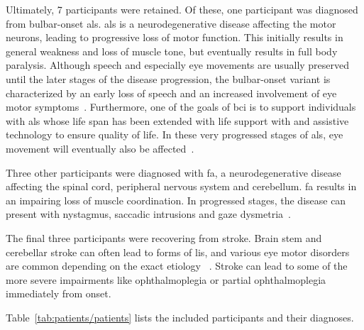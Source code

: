Ultimately, 7 participants were retained.
Of these, one participant was diagnosed from bulbar-onset \ac{als}.
\ac{als} is a neurodegenerative disease affecting the motor neurons, leading to
progressive loss of motor function.
This initially results in general weakness and loss of muscle tone, but
eventually results in full body paralysis.
Although speech and especially eye movements are usually preserved until the
later stages of the disease progression, the bulbar-onset variant is
characterized by an early loss of speech and an increased involvement of eye
motor symptoms~\cite{Guo2022}.
Furthermore, one of the goals of \ac{bci} is to support individuals with \ac{als}
whose life span has been extended with life support with and assistive technology to
ensure quality of life.
In these very progressed stages of \ac{als}, eye movement will eventually also
be affected~\cite{Hayashi1991}.

Three other participants were diagnosed with \ac{fa}, a neurodegenerative
disease affecting the
spinal cord, peripheral nervous system and cerebellum.
\ac{fa} results in an impairing loss of muscle coordination.
In progressed stages, the disease can present with nystagmus, saccadic
intrusions and gaze dysmetria~\cite{Cook2017}.

The final three participants were recovering from stroke.
Brain stem and cerebellar stroke can often lead to forms of \ac{lis}, and
various eye motor disorders are common depending on the exact etiology
~\cite{Bogousslavsky1987, Moncayo2009}.
Stroke can lead to some of the more severe impairments like ophthalmoplegia or
partial ophthalmoplegia immediately from onset.

Table~\ref{tab:patients/patients} lists the included participants and their
diagnoses.

\newcommand{\fnkuebler}{%
  \footnote{
``With minor degree of impairment,
we refer to patients who had only slightly impaired limb movement
and normal speech. Under the category moderate impairment, we
summarized those patients with restricted limb movement (wheelchair-bound) and
unaffected speech or intact limb movement without speech (such as the bulbar form of ALS which first affects speech
and swallowing). Patients who were almost tetraplegic with restricted speech were considered major impaired. Categories four
and five were the LIS and the CLIS, respectively."~\cite{Kuebler2008}
  }
}
\begin{table}[t]
  \centering
  \makebox[\textwidth][c]{%
  \footnotesize
  
  }
  \caption[Included participants with their diagnosis and
  capabilities.]{Included participants with their diagnosis and
  capabilities.
  Trach.: underwent a tracheostomy, Cls. W: classification according
  to~\textcite{Wolpaw2006}, Cls. KB: classification according
  to~\textcite{Kuebler2008}\fnkuebler.
  }
  \label{tab:patients/patients}
\end{table}

